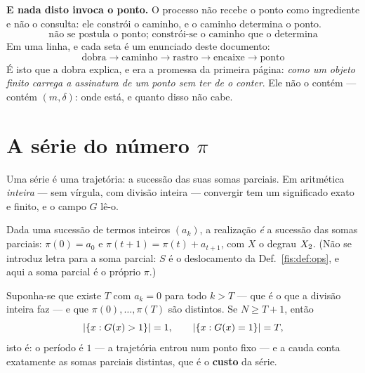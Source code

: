 \documentclass[livro.tex]{subfiles}
\begin{document}
\medskip\noindent\textbf{E nada disto invoca o ponto.} O processo não recebe o
ponto como ingrediente e não o consulta: ele constrói o caminho, e o caminho
determina o ponto.
\[
\boxed{\;\text{não se postula o ponto; constrói-se o caminho que o determina}\;}
\]
Em uma linha, e cada seta é um enunciado deste documento:
\[
\boxed{\;
\text{dobra}\to\text{caminho}\to\text{rastro}\to\text{encaixe}\to\text{ponto}
\;}
\]
É isto que a dobra explica, e era a promessa da primeira página: \emph{como um
objeto finito carrega a assinatura de um ponto sem ter de o conter}. Ele não o
contém --- contém $(m,\delta)$: onde está, e quanto disso não cabe.


\section{A série do número $\pi$}\label{fis:pi}

\noindent Uma série é uma trajetória: a sucessão das suas somas parciais. Em
aritmética \emph{inteira} --- sem vírgula, com divisão inteira --- convergir tem
um significado exato e finito, e o campo $G$ lê-o.

\begin{definicao}\label{fis:def:serie}
Dada uma sucessão de termos inteiros $(a_k)$, a realização \emph{é} a sucessão
das somas parciais: $\pi(0)=a_0$ e $\pi(t+1)=\pi(t)+a_{t+1}$, com $X$ o degrau
$X_2$. (Não se introduz letra para a soma parcial: $S$ é o deslocamento da
Def.~\ref{fis:def:ops}, e aqui a soma parcial é o próprio $\pi$.)
\end{definicao}

\begin{teorema}\label{fis:thm:serie}
Suponha-se que existe $T$ com $a_k=0$ para todo $k>T$ --- que é o que a divisão
inteira faz --- e que $\pi(0),\dots,\pi(T)$ são distintos. Se $N\ge T+1$, então
\[
\lvert \{x:G(x)>1\}\rvert=1,\qquad
\lvert \{x:G(x)=1\}\rvert=T,
\]
isto é: o período é $1$ --- a trajetória entrou num ponto fixo --- e a cauda
conta exatamente as somas parciais distintas, que é o \textbf{custo} da série.
\end{teorema}
\end{document}
